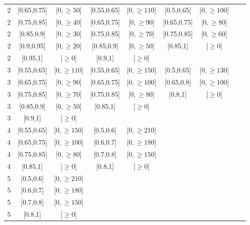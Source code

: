 \begin{table}
\begin{adjustwidth}{-0.5in}{-1in}
\begin{tabular}{c|cc|cc|cc|cc|}
\hline
2 & [0.65,0.75] & [$0,\geq 50$]  &[0.55,0.65] & [$0,\geq 110$]  &[0.5,0.65] & [$0,\geq 100$]  & &   \\
2 & [0.75,0.85] & [$0,\geq 40$]  &[0.65,0.75] & [$0,\geq 90$]  &[0.65,0.75] & [$0,\geq 80$]  & &   \\
2 & [0.85,0.9] & [$0,\geq 30$]  &[0.75,0.85] & [$0,\geq 70$]  &[0.75,0.85] & [$0,\geq 60$]  & &   \\
2 & [0.9,0.95] & [$0,\geq 20$]  &[0.85,0.9] & [$0,\geq 50$]  &[0.85,1] & [$\geq 0$]  & &   \\
2 & [0.95,1] & [$\geq 0$]  &[0.9,1] & [$\geq 0$]  &  &   &  &   \\
\hline
3 & [0.55,0.65] & [$0,\geq 110$]  &[0.55,0.65] & [$0,\geq 150$]  &[0.5,0.65] & [$0,\geq 130$]  & &   \\
3 & [0.65,0.75] & [$0,\geq 90$]  &[0.65,0.75] & [$0,\geq 100$]  &[0.65,0.8] & [$0,\geq 100$]  & &   \\
3 & [0.75,0.85] & [$0,\geq 70$]  &[0.75,0.85] & [$0,\geq 80$]  &[0.8,1] & [$\geq 0$]  & &   \\
3 & [0.85,0.9] & [$0,\geq 50$]  &[0.85,1] & [$\geq 0$]  &  &   &  &   \\
3 & [0.9,1] & [$\geq 0$]  &  &   &   &   &  &   \\
\hline
4 & [0.55,0.65] & [$0,\geq 150$]  &[0.5,0.6] & [$0,\geq 210$]  &  &   &  &   \\
4 & [0.65,0.75] & [$0,\geq 100$]  &[0.6,0.7] & [$0,\geq 180$]  &  &   &  &   \\
4 & [0.75,0.85] & [$0,\geq 80$]  &[0.7,0.8] & [$0,\geq 150$]  &  &   &  &   \\
4 & [0.85,1] & [$\geq 0$]  &[0.8,1] & [$\geq 0$]  &  &   &  &   \\
\hline
5 & [0.5,0.6] & [$0,\geq 210$]  &  &   &   &   &  &   \\
5 & [0.6,0.7] & [$0,\geq 180$]  &  &   &   &   &  &   \\
5 & [0.7,0.8] & [$0,\geq 150$]  &  &   &   &   &  &   \\
5 & [0.8,1] & [$\geq 0$]  &  &   &   &   &  &   \\
\hline



\end{tabular}
\end{adjustwidth}
\end{table}

